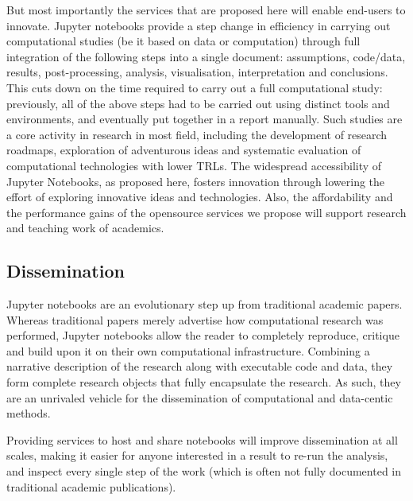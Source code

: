 But most importantly the services that are proposed here will enable
end-users to innovate. Jupyter notebooks provide a step change in efficiency in carrying out
computational studies (be it based on data or computation) through
full integration of the following steps into a single document:
assumptions, code/data, results, post-processing, analysis,
visualisation, interpretation and conclusions. This cuts down on the
time required to carry out a full computational study: previously, all
of the above steps had to be carried out using distinct tools and
environments, and eventually put together in a report manually. Such
studies are a core activity in research in most field, including the
development of research roadmaps, exploration of adventurous ideas and
systematic evaluation of computational technologies with lower
TRLs.
The widespread accessibility of Jupyter Notebooks, as proposed
here, fosters innovation through lowering the effort of exploring
innovative ideas and technologies. Also, the affordability and the performance gains
of the opensource services we propose will support research and teaching
work of academics.


\subsection{Dissemination}

Jupyter notebooks are an evolutionary step up from traditional
academic papers.  Whereas traditional papers merely advertise how
computational research was performed, Jupyter notebooks allow the
reader to completely reproduce, critique and build upon it on their
own computational infrastructure.  Combining a narrative description
of the research along with executable code and data, they form
complete research objects that fully encapsulate the research. As
such, they are an unrivaled vehicle for the dissemination of
computational and data-centic methods.

Providing services to host and share notebooks will improve
dissemination at all scales, making it easier for anyone interested in
a result to re-run the analysis, and inspect every single step of the
work (which is often not fully documented in traditional academic
publications).

